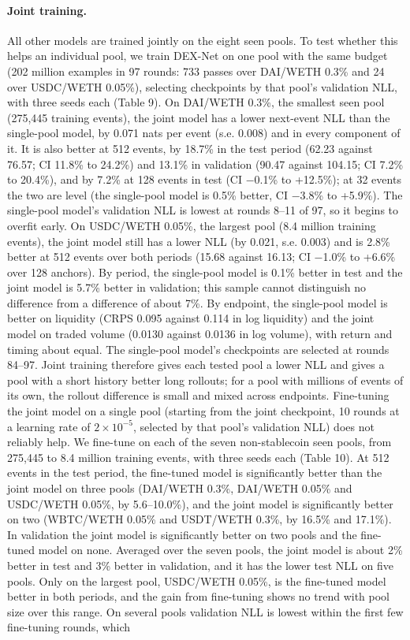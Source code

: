 \documentclass[11pt]{article}
\begin{document}
\paragraph{Joint training.} All other models are trained jointly on the eight seen pools. To test whether this helps an individual pool, we train DEX-Net on one pool with the same budget (202 million examples in 97 rounds: 733 passes over DAI/WETH 0.3\% and 24 over USDC/WETH 0.05\%), selecting checkpoints by that pool's validation NLL, with three seeds each (Table 9). On DAI/WETH 0.3\%, the smallest seen pool (275,445 training events), the joint model has a lower next-event NLL than the single-pool model, by 0.071 nats per event (s.e. 0.008) and in every component of it. It is also better at 512 events, by 18.7\% in the test period (62.23 against 76.57; CI 11.8\% to 24.2\%) and 13.1\% in validation (90.47 against 104.15; CI 7.2\% to 20.4\%), and by 7.2\% at 128 events in test (CI \ensuremath{-}0.1\% to +12.5\%); at 32 events the two are level (the single-pool model is 0.5\% better, CI \ensuremath{-}3.8\% to +5.9\%). The single-pool model's validation NLL is lowest at rounds 8--11 of 97, so it begins to overfit early. On USDC/WETH 0.05\%, the largest pool (8.4 million training events), the joint model still has a lower NLL (by 0.021, s.e. 0.003) and is 2.8\% better at 512 events over both periods (15.68 against 16.13; CI \ensuremath{-}1.0\% to +6.6\% over 128 anchors). By period, the single-pool model is 0.1\% better in test and the joint model is 5.7\% better in validation; this sample cannot distinguish no difference from a difference of about 7\%. By endpoint, the single-pool model is better on liquidity (CRPS 0.095 against 0.114 in log liquidity) and the joint model on traded volume (0.0130 against 0.0136 in log volume), with return and timing about equal. The single-pool model's checkpoints are selected at rounds 84--97. Joint training therefore gives each tested pool a lower NLL and gives a pool with a short history better long rollouts; for a pool with millions of events of its own, the rollout difference is small and mixed across endpoints. Fine-tuning the joint model on a single pool (starting from the joint checkpoint, 10 rounds at a learning rate of $2\times10^{-5}$, selected by that pool's validation NLL) does not reliably help. We fine-tune on each of the seven non-stablecoin seen pools, from 275,445 to 8.4 million training events, with three seeds each (Table 10). At 512 events in the test period, the fine-tuned model is significantly better than the joint model on three pools (DAI/WETH 0.3\%, DAI/WETH 0.05\% and USDC/WETH 0.05\%, by 5.6--10.0\%), and the joint model is significantly better on two (WBTC/WETH 0.05\% and USDT/WETH 0.3\%, by 16.5\% and 17.1\%). In validation the joint model is significantly better on two pools and the fine-tuned model on none. Averaged over the seven pools, the joint model is about 2\% better in test and 3\% better in validation, and it has the lower test NLL on five pools. Only on the largest pool, USDC/WETH 0.05\%, is the fine-tuned model better in both periods, and the gain from fine-tuning shows no trend with pool size over this range. On several pools validation NLL is lowest within the first few fine-tuning rounds, which 
\end{document}
